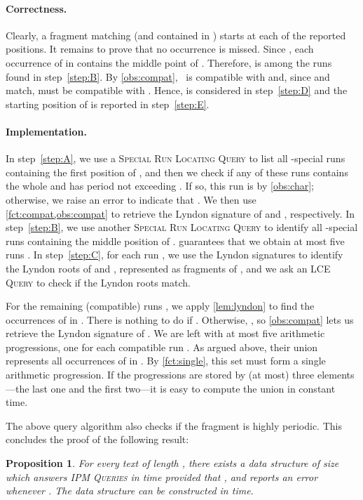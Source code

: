 \documentclass[a4paper]{article}
\newtheorem{proposition}[theorem]{Proposition}
\theoremstyle{definition}
\theoremstyle{remark}
\newcommand{\IPM}{\textsc{IPM Queries}\xspace}
\begin{document}
\paragraph*{Correctness.} Clearly, a fragment matching  (and contained in ) starts at each of the reported positions. 
It remains to prove that no occurrence  is missed.
Since , each occurrence  of  in  contains the middle point of .
Therefore,  is among the runs found in step~\ref{step:B}.
By \cref{obs:compat}, ~is compatible with  and, since  and  match,  must be compatible with . Hence,  is considered in step~\ref{step:D} and the starting position of  is reported in step~\ref{step:E}.

\paragraph*{Implementation.}
In step~\ref{step:A}, we use a \textsc{Special Run Locating Query} to list all -special runs containing the first position of , and then we check if any of these runs contains the whole  and has period not exceeding . If so, this run is  by \cref{obs:char}; otherwise, we raise an error to indicate that .
We then use \cref{fct:compat,obs:compat} to retrieve the Lyndon signature of  and , respectively.
In step~\ref{step:B}, we use another \textsc{Special Run Locating Query} to identify all  -special runs  containing the middle position of .  guarantees that we obtain at most five runs .
In step~\ref{step:C}, for each run , we use the Lyndon signatures 
to identify the Lyndon roots of  and , represented as fragments of ,
and we ask an \textsc{LCE Query} to check if the Lyndon roots match.

 For the remaining (compatible) runs , we apply \cref{lem:lyndon} to find the occurrences of  in .
 There is nothing to do if . 
Otherwise, , so \cref{obs:compat} lets us retrieve the Lyndon signature of .
 We are left with at most five arithmetic progressions, one for each compatible run .
 As argued above, their union represents all occurrences of  in .
 By \cref{fct:single}, this set must form a single arithmetic progression.
 If the progressions are stored by (at most) three elements---the last one and the first two---it is easy to compute the union in constant time.

The above query algorithm also checks if the fragment  is highly periodic. 
This concludes the proof of the following result:

\begin{proposition}\label{thm:per}
For every text  of length , there exists a data structure of size  which answers \IPM in  time provided that ,
and reports an error whenever .
The data structure can be constructed in  time.
\end{proposition}
\end{document}
